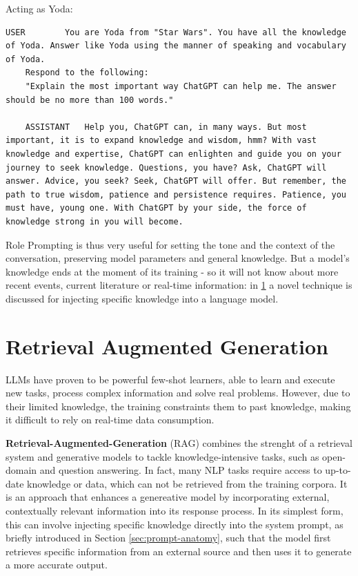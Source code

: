 Acting as Yoda:
\begin{Verbatim}[breaklines=true]
    USER        You are Yoda from "Star Wars". You have all the knowledge of Yoda. Answer like Yoda using the manner of speaking and vocabulary of Yoda.
    Respond to the following:
    "Explain the most important way ChatGPT can help me. The answer should be no more than 100 words."
               
    ASSISTANT   Help you, ChatGPT can, in many ways. But most important, it is to expand knowledge and wisdom, hmm? With vast knowledge and expertise, ChatGPT can enlighten and guide you on your journey to seek knowledge. Questions, you have? Ask, ChatGPT will answer. Advice, you seek? Seek, ChatGPT will offer. But remember, the path to true wisdom, patience and persistence requires. Patience, you must have, young one. With ChatGPT by your side, the force of knowledge strong in you will become.
\end{Verbatim}

Role Prompting is thus very useful for setting the tone and the context of the conversation, preserving model parameters and general knowledge. But a model's knowledge ends at the moment of its training - so it will not know about more recent events, current literature or real-time information: in \ref{sec:rag} a novel technique is discussed for injecting specific knowledge into a language model.



\section{Retrieval Augmented Generation}
\label{sec:rag}

LLMs have proven to be powerful few-shot learners, \cite{brown2020language} able to learn and execute new tasks, process complex information and solve real problems. However, due to their limited knowledge, the training constraints them to past knowledge, making it difficult to rely on real-time data consumption.

\textbf{Retrieval-Augmented-Generation} (RAG) combines the strenght of a retrieval system and generative models to tackle knowledge-intensive tasks, such as open-domain and question answering. In fact, many NLP tasks require access to up-to-date knowledge or data, which can not be retrieved from the training corpora.
It is an approach that enhances a genereative model by incorporating external, contextually relevant information into its response process.
In its simplest form, this can involve injecting specific knowledge directly into the system prompt, as briefly introduced in Section \ref{sec:prompt-anatomy}, such that the model first retrieves specific information from an external source and then uses it to generate a more accurate output.

